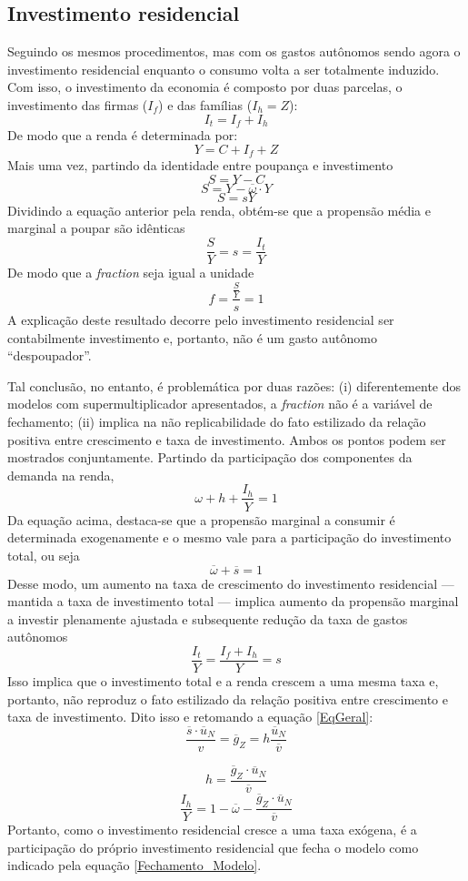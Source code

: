 \subsection{Investimento residencial}

Seguindo os mesmos procedimentos, mas com os gastos autônomos sendo agora o investimento residencial enquanto o consumo volta a ser totalmente induzido. Com isso, o investimento da economia é composto por duas parcelas, o investimento das firmas ($I_f$) e das famílias ($I_h = Z$):
$$
I_t = I_f + I_h
$$
De modo que a renda é determinada por:
$$
Y = C + I_f + Z
$$
Mais uma vez, partindo da identidade entre poupança e investimento
$$
S = Y - C
$$
$$
S = Y - \overline \omega\cdot Y
$$
$$
S = sY
$$
Dividindo a equação anterior pela renda, obtém-se que a propensão média e marginal a poupar são idênticas
$$
\frac{S}{Y} = s = \frac{I_t}{Y}
$$
De modo que a \textit{fraction} seja igual a unidade
$$
f = \frac{\frac{S}{Y}}{s} = 1
$$
A explicação deste resultado decorre pelo investimento residencial ser contabilmente investimento e, portanto, não é um gasto autônomo ``despoupador''. 

Tal conclusão, no entanto, é problemática por duas razões: (i) diferentemente dos modelos com supermultiplicador apresentados, a \textit{fraction} não é a variável de fechamento; (ii) implica na não replicabilidade do fato estilizado da relação positiva entre crescimento e taxa de investimento. Ambos os pontos podem ser mostrados conjuntamente. Partindo da participação dos componentes da demanda na renda,
$$
\omega + h + \frac{I_h}{Y} = 1
$$
Da equação acima, destaca-se que a propensão marginal a consumir é determinada exogenamente e o mesmo vale para a participação do investimento total, ou seja
$$
\overline \omega + \overline s = 1
$$
Desse modo, um aumento na taxa de crescimento do investimento residencial --- mantida a taxa de investimento total --- implica aumento da propensão marginal a investir plenamente ajustada e subsequente redução da taxa de gastos autônomos
$$
\frac{I_t}{Y} = \frac{I_f + I_h}{Y} = s
$$
Isso implica que o investimento total e a renda crescem a uma mesma taxa e, portanto, não reproduz o fato estilizado da relação positiva entre crescimento e taxa de investimento. Dito isso e retomando a equação \ref{EqGeral}:
$$
\frac{\overline s\cdot \overline u_N}{v} = \overline g_Z = h\frac{\overline u_N}{\overline v}
$$

\begin{equation}
h = \frac{\overline g_Z\cdot \overline u_N}{\overline v}
\end{equation}
\begin{equation}
    \label{Fechamento_Modelo}
\frac{I_h}{Y} = 1 - \overline\omega - \frac{\overline g_Z\cdot \overline u_N}{\overline v}
\end{equation}
Portanto, como o investimento residencial cresce a uma taxa exógena, é a participação do próprio investimento residencial que fecha o modelo como indicado pela equação \ref{Fechamento_Modelo}. 

